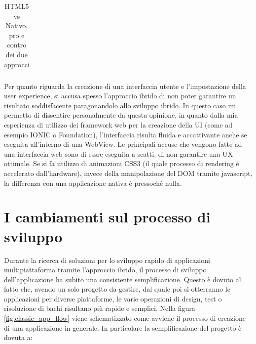 \begin{table}[h]
\begin{tabular}{|p{7.5cm}p{7.5cm}|}
	\end{tabular}
	\caption{HTML5 vs Nativo, pro e contro dei due approcci}
	\label{tbl:html5_vs_native}
\end{table}

Per quanto riguarda la creazione di una interfaccia utente e l'impostazione della user experience, si accusa spesso l'approccio ibrido di non poter garantire un risultato soddisfacente paragonandolo allo sviluppo ibrido. In questo caso mi permetto di dissentire personalmente da questa opinione, in quanto dalla mia esperienza di utilizzo dei framework web per la creazione della UI (come ad esempio IONIC o Foundation), l'interfaccia risulta fluida e accattivante anche se eseguita all'interno di una WebView. Le principali accuse che vengono fatte ad una interfaccia web sono di essre eseguita a scatti, di non garantire una UX ottimale. Se si fa utilizzo di animazioni CSS3 (il quale processo di rendering è accelerato dall'hardware), invece della manipolazione del DOM tramite javascript, la differenza con una applicazione nativa è pressoché nulla.

\section{I cambiamenti sul processo di sviluppo}
Durante la ricerca di soluzioni per lo sviluppo rapido di applicazioni multipiattaforma tramite l'approccio ibrido, il processo di sviluppo dell'applicazione ha subito una consistente semplificazione. Questo è dovuto al fatto che, avendo un solo progetto da gestire, dal quale poi si otterranno le applicazioni per diverse piattaforme, le varie operazioni di design, test o risoluzione di bachi risultano più rapide e semplici. Nella figura \ref{fig:classic_app_flow} viene schematizzato come avviene il processo di creazione di una applicazione in generale. In particolare la semplificazione del progetto è dovuta a:

